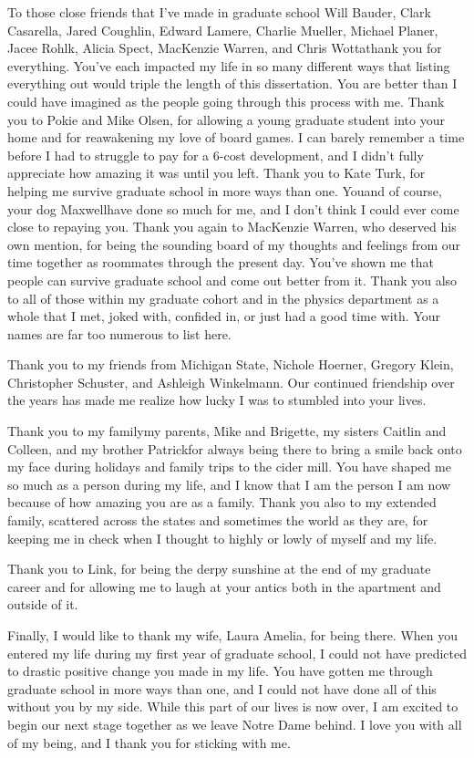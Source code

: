 \begin{acknowledge}
To those close friends that I've made in graduate school\textemdash{}
Will Bauder, Clark Casarella, Jared Coughlin, Edward Lamere, Charlie
Mueller, Michael Planer, Jacee Rohlk, Alicia Spect, MacKenzie Warren,
and Chris Wotta\textemdash{}thank you for everything. You've each
impacted my life in so many different ways that listing everything out
would triple the length of this dissertation. You are better than I
could have imagined as the people going through this process with me.
Thank you to Pokie and Mike Olsen, for allowing a young graduate student
into your home and for reawakening my love of board games. I can barely
remember a time before I had to struggle to pay for a 6-cost
development, and I didn't fully appreciate how amazing it was until you
left. Thank you to Kate Turk, for helping me survive graduate school in
more ways than one. You\textemdash{}and of course, your dog
Maxwell\textemdash{}have done so much for me, and I don't think I could
ever come close to repaying you. Thank you again to MacKenzie Warren,
who deserved his own mention, for being the sounding board of my
thoughts and feelings from our time together as roommates through the
present day. You've shown me that people can survive graduate school and
come out better from it. Thank you also to all of those within my
graduate cohort and in the physics department as a whole that I met,
joked with, confided in, or just had a good time with. Your names are
far too numerous to list here.

Thank you to my friends from Michigan State, Nichole Hoerner, Gregory
Klein, Christopher Schuster, and Ashleigh Winkelmann. Our continued
friendship over the years has made me realize how lucky I was to
stumbled into your lives.

Thank you to my family\textemdash{}my parents, Mike and Brigette, my
sisters Caitlin and Colleen, and my brother Patrick\textemdash{}for
always being there to bring a smile back onto my face during holidays
and family trips to the cider mill. You have shaped me so much as a
person during my life, and I know that I am the person I am now because
of how amazing you are as a family. Thank you also to my extended
family, scattered across the states and sometimes the world as they are,
for keeping me in check when I thought to highly or lowly of myself and
my life.

Thank you to Link, for being the derpy sunshine at the end of my
graduate career and for allowing me to laugh at your antics both in the
apartment and outside of it.

Finally, I would like to thank my wife, Laura Amelia, for being there.
When you entered my life during my first year of graduate school, I
could not have predicted to drastic positive change you made in my life.
You have gotten me through graduate school in more ways than one, and I
could not have done all of this without you by my side. While this part
of our lives is now over, I am excited to begin our next stage together
as we leave Notre Dame behind. I love you with all of my being, and I
thank you for sticking with me.

\end{acknowledge}
